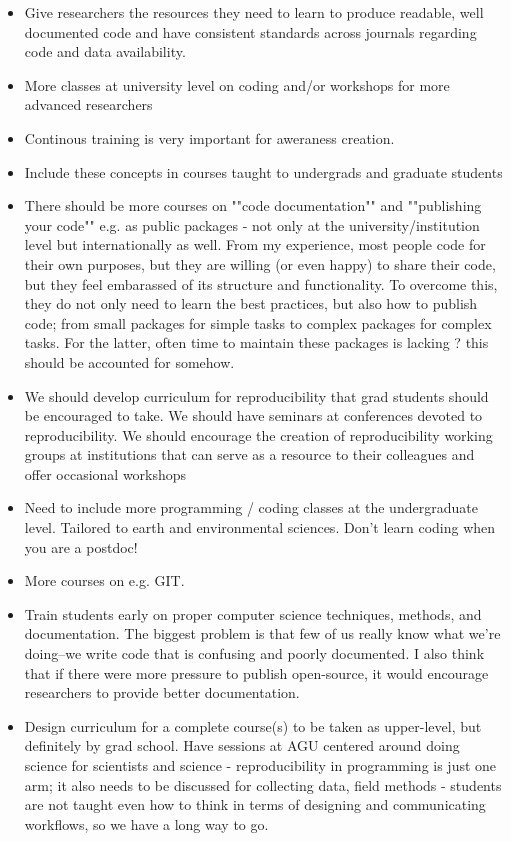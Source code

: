 \documentclass{article}
\begin{document}
\begin{itemize}
	\item Give researchers the resources they need to learn to produce readable, well documented code and have consistent standards across journals regarding code and data availability.
	\item More classes at university level on coding and/or workshops for more advanced researchers
	\item Continous training is very important for aweraness creation.
	\item Include these concepts in courses taught to undergrads and graduate students
	\item There should be more courses on ""code documentation"" and ""publishing your code"" e.g. as public packages - not only at the university/institution level but internationally as well. From my experience, most people code for their own purposes, but they are willing (or even happy) to share their code, but they feel embarassed of its structure and functionality. To overcome this, they do not only need to learn the best practices, but also how to publish code; from small packages for simple tasks to complex packages for complex tasks. For the latter, often time to maintain these packages is lacking ? this should be accounted for somehow.
	\item We should develop curriculum for reproducibility that grad students should be encouraged to take. We should have seminars at conferences devoted to reproducibility. We should encourage the creation of reproducibility working groups at institutions that can serve as a resource to their colleagues and offer occasional workshops
	\item Need to include more programming / coding classes at the undergraduate level. Tailored to earth and environmental sciences. Don't learn coding when you are a postdoc!
	\item More courses on e.g. GIT.
	\item Train students early on proper computer science techniques, methods, and documentation. The biggest problem is that few of us really know what we're doing--we write code that is confusing and poorly documented. I also think that if there were more pressure to publish open-source, it would encourage researchers to provide better documentation.
	\item Design curriculum for a complete course(s) to be taken as upper-level, but definitely by grad school. Have sessions at AGU centered around doing science for scientists and science - reproducibility in programming is just one arm; it also needs to be discussed for collecting data, field methods - students are not taught even how to think in terms of designing and communicating workflows, so we have a long way to go. 

\end{itemize}
\end{document}

